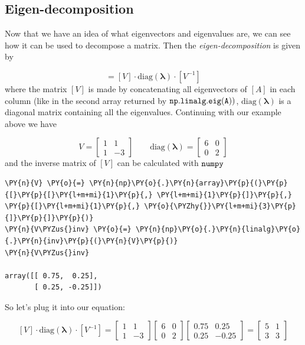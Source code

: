 \subsection{Eigen-decomposition}
\label{concatenating-eigenvalues-and-eigenvectors}

Now that we have an idea of what eigenvectors and eigenvalues are, we
can see how it can be used to decompose a matrix. 
Then the \emph{eigen-decomposition} is given by

\begin{equation}
[A]=[V]\cdot \textrm{diag}(\boldsymbol{\lambda})\cdot [V^{−1}]
\end{equation}
where the matrix $[V]$ is made by concatenating all eigenvectors
of $[A]$ in each column (like in the second array returned by
\(\tt{np.linalg.eig(A))}\), \(\textrm{diag}(\boldsymbol{\lambda})\) 
is a diagonal matrix containing all the eigenvalues.
Continuing with our example above we have

\[V=\begin{bmatrix}
1 & 1 \\
1 &−3\end{bmatrix}\qquad 
\textrm{diag}(\boldsymbol{\lambda})=\begin{bmatrix}
6&0\\
0&2\end{bmatrix}\] 
and the inverse matrix of \([V]\) can be calculated with
\(\tt{numpy}\)

\begin{tcolorbox}[breakable, size=fbox, boxrule=1pt, pad at break*=1mm,colback=cellbackground, colframe=cellborder]
\begin{Verbatim}[commandchars=\\\{\}]
\PY{n}{V} \PY{o}{=} \PY{n}{np}\PY{o}{.}\PY{n}{array}\PY{p}{(}\PY{p}{[}\PY{p}{[}\PY{l+m+mi}{1}\PY{p}{,} \PY{l+m+mi}{1}\PY{p}{]}\PY{p}{,} \PY{p}{[}\PY{l+m+mi}{1}\PY{p}{,} \PY{o}{\PYZhy{}}\PY{l+m+mi}{3}\PY{p}{]}\PY{p}{]}\PY{p}{)}
\PY{n}{V\PYZus{}inv} \PY{o}{=} \PY{n}{np}\PY{o}{.}\PY{n}{linalg}\PY{o}{.}\PY{n}{inv}\PY{p}{(}\PY{n}{V}\PY{p}{)}
\PY{n}{V\PYZus{}inv}

array([[ 0.75,  0.25],
       [ 0.25, -0.25]])
\end{Verbatim}
\end{tcolorbox}

So let's plug it into our equation:

\[ [V]\cdot\textrm{diag}(\boldsymbol{\lambda})\cdot [V^{−1}]=
\begin{bmatrix}
1 & 1 \\
1 &−3\end{bmatrix}
\begin{bmatrix}
6&0\\
0&2\end{bmatrix}
\begin{bmatrix}
0.75 & 0.25\\
0.25&-0.25 \end{bmatrix}
=\begin{bmatrix}
5 & 1\\
3& 3\end{bmatrix}
\]


